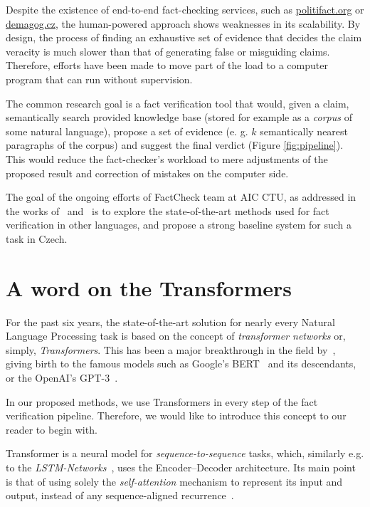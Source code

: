 Despite the existence of end-to-end fact-checking services, such as \url{politifact.org} or \url{demagog.cz}, the human-powered approach shows weaknesses in its scalability. By design, the process of finding an exhaustive set of evidence that decides the claim veracity is much slower than that of generating false or misguiding claims. Therefore, efforts have been made to move part of the load to a computer program that can run without supervision.

The common research goal is a fact verification tool that would, given a claim, semantically search provided knowledge base (stored for example as a \textit{corpus} of some natural language), propose a set of evidence (e. g. $k$ semantically nearest paragraphs of the corpus) and suggest the final verdict (Figure \ref{fig:pipeline}). This would reduce the fact-checker's workload to mere adjustments of the proposed result and correction of mistakes on the computer side. 

The goal of the ongoing efforts of {\textsf{FactCheck}} team at {\textsf{AIC CTU}}, as addressed in the works of~\cite{rypar,dedkova} and~\cite{gazo} is to explore the state-of-the-art methods used for fact verification in other languages, and propose a strong baseline system for such a task in Czech.


\section{A word on the Transformers}
\label{sec:transformers}
For the past six years, the state-of-the-art solution for nearly every Natural Language Processing task is based on the concept of \textit{transformer networks} or, simply, \textit{Transformers}. This has been a major breakthrough in the field by~\cite{vaswani}, giving birth to the famous models such as \textsf{Google}'s \textsf{BERT}~\cite{bert} and its descendants, or the \textsf{OpenAI}'s \textsf{GPT-3}~\cite{gpt3}.

In our proposed methods, we use Transformers in every step of the fact verification pipeline. Therefore, we would like to introduce this concept to our reader to begin with. 

Transformer is a neural model for \textit{sequence-to-sequence} tasks, which, similarly e.g. to the \textit{LSTM-Networks}~\cite{lstm}, uses the Encoder--Decoder architecture. Its main point is that of using solely the \textit{self-attention} mechanism to represent its input and output, instead of any sequence-aligned recurrence~\cite{vaswani}.


